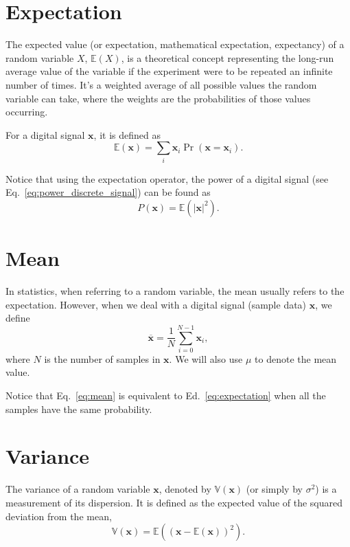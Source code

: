 
\section{Expectation}
The expected value (or expectation, mathematical expectation,
expectancy) of a random variable $X$, $\mathbb{E}(X)$, is a
theoretical concept representing the long-run average value of the
variable if the experiment were to be repeated an infinite number of
times. It's a weighted average of all possible values the random
variable can take, where the weights are the probabilities of those
values occurring.

For a digital signal $\mathbf{x}$, it is defined as
\begin{equation}
  \mathbb{E}(\mathbf{x})=\sum_i\mathbf{x}_i\Pr(\mathbf{x}=\mathbf{x}_i).
  \label{eq:expectation}
\end{equation}

Notice that using the expectation operator, the power of a digital
signal (see Eq.~\ref{eq:power_discrete_signal}) can be found as
\begin{equation}
  P(\mathbf{x}) = \mathbb{E}(|\mathbf{x}|^2).
  \label{eq:power_as_expectation}
\end{equation}

\section{Mean}
In statistics, when referring to a random variable, the mean usually
refers to the expectation. However, when we deal with a digital signal
(sample data) $\mathbf{x}$, we define
\begin{equation}
  \overline{\mathbf{x}} = \frac{1}{N}\sum_{i=0}^{N-1}\mathbf{x}_i,
  \label{eq:mean}
\end{equation}
where $N$ is the number of samples in $\mathbf{x}$. We will also use
$\mu$ to denote the mean value.

Notice that Eq.~\ref{eq:mean} is equivalent to
Ed.~\ref{eq:expectation} when all the samples have the same
probability.

\section{Variance}
\label{sec:variance}

The variance of a random variable $\mathbf{x}$, denoted by
$\mathbb{V}(\mathbf{x})$ (or simply by $\sigma^2$) is a measurement of
its dispersion. It is defined as the expected value of the squared
deviation from the mean,
\begin{equation}
  \mathbb{V}(\mathbf{x}) = \mathbb{E}\left((\mathbf{x} - \mathbb{E}(\mathbf{x}))^2 \right).
  \label{eq:variance}
\end{equation}

